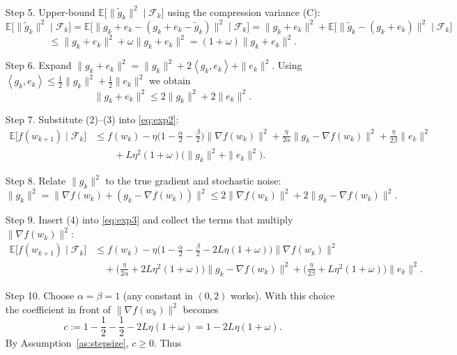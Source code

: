 \documentclass{article}
\newcommand{\E}{\mathbb{E}}
\newcommand{\inner}[2]{\left\langle #1,#2\right\rangle}
\begin{document}
\begin{enumerate}
\begin{align}
\end{align}
\item[Step 5.] Upper‑bound $\E\!\big[\|\tilde g_k\|^{2}\mid\mathcal{F}_k\big]$ using the compression variance (C):
\[
    \E\!\big[\|\tilde g_k\|^{2}\mid\mathcal{F}_k\big]
    =\E\!\big[\|g_k+e_k-(g_k+e_k-\tilde g_k)\|^{2}\mid\mathcal{F}_k\big]
    =\|g_k+e_k\|^{2}+\E\!\big[\|\tilde g_k-(g_k+e_k)\|^{2}\mid\mathcal{F}_k\big]
\]
\[
    \le \|g_k+e_k\|^{2}+\omega\|g_k+e_k\|^{2}
    =(1+\omega)\|g_k+e_k\|^{2}. \tag{2}
\]
\item[Step 6.] Expand $\|g_k+e_k\|^{2}= \|g_k\|^{2}+2\inner{g_k}{e_k}+\|e_k\|^{2}$. Using $\inner{g_k}{e_k}\le \frac{1}{2}\|g_k\|^{2}+\frac{1}{2}\|e_k\|^{2}$ we obtain
\[
    \|g_k+e_k\|^{2}\le 2\|g_k\|^{2}+2\|e_k\|^{2}. \tag{3}
\]
\item[Step 7.] Substitute (2)–(3) into \eqref{eq:exp2}:
\begin{align}
    \E\!\big[f(w_{k+1})\mid\mathcal{F}_k\big]
    &\le f(w_k)-\eta\Big(1-\frac{\alpha}{2}-\frac{\beta}{2}\Big)\|\nabla f(w_k)\|^{2}
      +\frac{\eta}{2\alpha}\|g_k-\nabla f(w_k)\|^{2}
      +\frac{\eta}{2\beta}\|e_k\|^{2} \nonumber\\
    &\qquad +L\eta^{2}(1+\omega)\big(\|g_k\|^{2}+\|e_k\|^{2}\big). \label{eq:exp3}
\end{align}
\item[Step 8.] Relate $\|g_k\|^{2}$ to the true gradient and stochastic noise:
\[
    \|g_k\|^{2} = \|\nabla f(w_k)+(g_k-\nabla f(w_k))\|^{2}
    \le 2\|\nabla f(w_k)\|^{2}+2\|g_k-\nabla f(w_k)\|^{2}. \tag{4}
\]
\item[Step 9.] Insert (4) into \eqref{eq:exp3} and collect the terms that multiply $\|\nabla f(w_k)\|^{2}$:
\begin{align}
    \E\!\big[f(w_{k+1})\mid\mathcal{F}_k\big]
    &\le f(w_k)
      -\eta\Big(1-\frac{\alpha}{2}-\frac{\beta}{2}-2L\eta(1+\omega)\Big)\|\nabla f(w_k)\|^{2} \nonumber\\
    &\quad +\Big(\frac{\eta}{2\alpha}+2L\eta^{2}(1+\omega)\Big)\|g_k-\nabla f(w_k)\|^{2}
      +\Big(\frac{\eta}{2\beta}+L\eta^{2}(1+\omega)\Big)\|e_k\|^{2}. \label{eq:exp4}
\end{align}
\item[Step 10.] Choose $\alpha=\beta=1$ (any constant in $(0,2)$ works). With this choice the coefficient in front of $\|\nabla f(w_k)\|^{2}$ becomes
\[
    c:=1-\frac{1}{2}-\frac{1}{2}-2L\eta(1+\omega)=1-2L\eta(1+\omega).
\]
By Assumption~\ref{as:stepsize}, $c\ge0$. Thus
\begin{align}

\end{align}
\end{enumerate}
\end{document}
